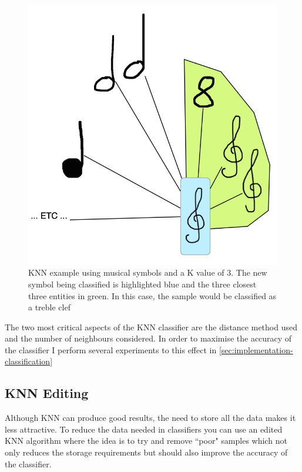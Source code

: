  \begin{figure}[h!]
   \centering
   \includegraphics{gfx/techniques/knn-entities.png}
   \caption{KNN example using musical symbols and a K value of 3. The new symbol being classified is highlighted blue and the three closest three entities in green. In this case, the sample would be classified as a treble clef}
   \label{fig:knn-example}
 \end{figure}

The two most critical aspects of the KNN classifier are the distance method used and the number of neighbours considered. In order to maximise the accuracy of the classifier I perform several experiments to this effect in \cref{sec:implementation-classification}

\subsection{KNN Editing}

Although KNN can produce good results, the need to store all the data makes it less attractive. To reduce the data needed in classifiers you can use an edited KNN algorithm where the idea is to try and remove ``poor" samples which not only reduces the storage requirements but should also improve the accuracy of the classifier.

